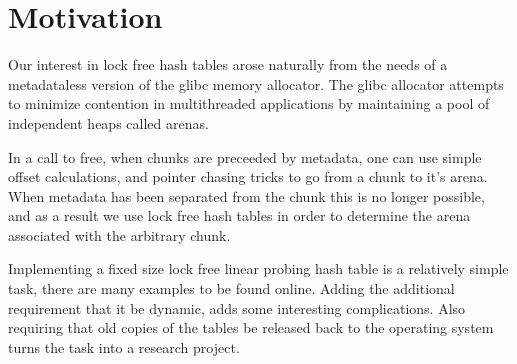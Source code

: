 \section{Motivation}
\label{sec:intro}

Our interest in lock free hash tables arose naturally from the needs
of a metadataless version of the glibc memory allocator.  The glibc
allocator attempts to minimize contention in multithreaded
applications by maintaining a pool of independent heaps called arenas.

In a call to free, when chunks are preceeded by metadata, one can use
simple offset calculations, and pointer chasing tricks to go from a
chunk to it's arena. When metadata has been separated from the chunk
this is no longer possible, and as a result we use lock free hash
tables in order to determine the arena associated with the arbitrary
chunk.


Implementing a fixed size lock free linear probing hash table is a
relatively simple task, there are many examples to be found online.
Adding the additional requirement that it be dynamic, adds some
interesting complications. Also requiring that old copies of the
tables be released back to the operating system turns the task into a
research project.

